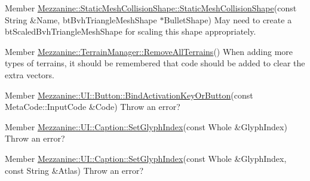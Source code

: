 \label{todo__todo000006}
\hypertarget{todo__todo000006}{}
 
\begin{DoxyDescription}
\item[Member \hyperlink{classMezzanine_1_1StaticMeshCollisionShape_a1c565cc4d62ab7a0cd5cf55254905f05}{Mezzanine::StaticMeshCollisionShape::StaticMeshCollisionShape}(const String \&Name, btBvhTriangleMeshShape $\ast$BulletShape) ]May need to create a btScaledBvhTriangleMeshShape for scaling this shape appropriately. 
\end{DoxyDescription}

\label{todo__todo000032}
\hypertarget{todo__todo000032}{}
 
\begin{DoxyDescription}
\item[Member \hyperlink{classMezzanine_1_1TerrainManager_ae940f33a369e54c2322de4202d236eb2}{Mezzanine::TerrainManager::RemoveAllTerrains}() ]When adding more types of terrains, it should be remembered that code should be added to clear the extra vectors. 
\end{DoxyDescription}

\label{todo__todo000033}
\hypertarget{todo__todo000033}{}
 
\begin{DoxyDescription}
\item[Member \hyperlink{classMezzanine_1_1UI_1_1Button_aae0a7f6a07f79856ed6da8b8b3bc5ecd}{Mezzanine::UI::Button::BindActivationKeyOrButton}(const MetaCode::InputCode \&Code) ]Throw an error? 
\end{DoxyDescription}

\label{todo__todo000034}
\hypertarget{todo__todo000034}{}
 
\begin{DoxyDescription}
\item[Member \hyperlink{classMezzanine_1_1UI_1_1Caption_a2cc9da9ae1e10cd5829117f0d473186a}{Mezzanine::UI::Caption::SetGlyphIndex}(const Whole \&GlyphIndex) ]Throw an error? 
\end{DoxyDescription}

\label{todo__todo000035}
\hypertarget{todo__todo000035}{}
 
\begin{DoxyDescription}
\item[Member \hyperlink{classMezzanine_1_1UI_1_1Caption_abe41befd65e977a1bb300427d0dd5936}{Mezzanine::UI::Caption::SetGlyphIndex}(const Whole \&GlyphIndex, const String \&Atlas) ]Throw an error? 
\end{DoxyDescription}

